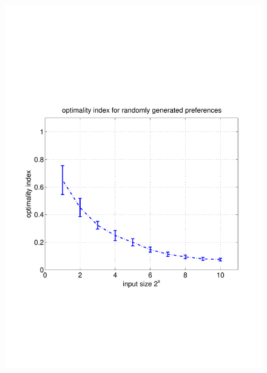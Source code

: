 \documentclass[11pt]{article}
\begin{document}
\begin{figure}
	\includegraphics[width=\linewidth]{../../code/data/2014_12_12_00_55_41/figure_14}
\end{figure}
\end{document}
